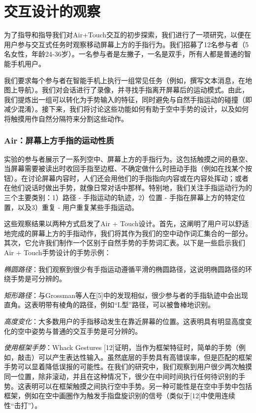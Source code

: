 \section{交互设计的观察}

为了指导和指导我们对Air+Touch交互的初步探索，我们进行了一项研究，以便在用户参与交互式任务时观察移动屏幕上方的手指行为。我们招募了12名参与者（5名女性，年龄24-36岁）。一名参与者是左撇子，一名是双手，所有人都是普通的智能手机用户。

我们要求每个参与者在智能手机上执行一组常见任务（例如，撰写文本消息，在地图上导航）。我们对会话进行了录像，并寻找手指离开屏幕后的运动模式。由此，我们提炼出一组可以转化为手势输入的特征，同时避免与自然手指运动的碰撞（即减少混淆）。接下来，我们将讨论这些功能如何有助于空中手势的设计，以及如何将触摸用作自然分隔符来分割这些动作。 

\subsubsection{Air：屏幕上方手指的运动性质}

实验的参与者展示了一系列空中、屏幕上方的手指行为。这包括触摸之间的悬空、当屏幕需要被读出时收回手指至边框、不确定做什么时扭动手指（例如在找某个按钮）。在讨论屏幕内容时，人们还会用他们的手指指向内容或在内容处挥动；或者在他们说话时做出手势，就像日常对话中那样。特别地，我们关注手指运动行为的三个主要类别：1）路径 - 手指运动的轨迹，2）位置 - 手指在屏幕上方的特定位置，以及3）重复 - 用户重复某些手指运动。

这些观察结果以两种方式启发了Air + Touch设计。首先，这阐明了用户可以舒适地完成的屏幕上方的手指动作，我们将其作为我们的空中动作词汇集合的一部分。其次，它允许我们制作一个区别于自然手势的手势词汇表。以下是一些启示我们Air + Touch手势设计的手势示例：

\textit{椭圆路径}：我们观察到很少有手指运动遵循平滑的椭圆路径，这说明椭圆路径的环绕手势是可分辨的。

\textit{矩形路径}：与Grossman等人在[5]中的发现相似，很少参与者的手指轨迹中会出现直角。这表明带有棱角的路径，例如“L型”路径，可以被鲁棒地识别。


\textit{高度变化}：大多数用户的手指移动发生在靠近屏幕的位置。这表明具有明显高度变化的空中姿势与普通的交互手势是可分辨的。

\textit{使用框架手势}：Whack Gestures [12]证明，当作为框架特征时，简单的手势（例如，敲击）可以产生表达性输入。虽然底层的手势具有高错误率，但是匹配的框架手势可以显着降低误报的可能性。在我们的研究中，我们观察到用户很少两次触摸同一位置，除非滚动，并且在这种情况下，很少在中间时间执行任何待识别的手势。这表明可以在框架触摸之间执行空中手势。另一种可能性是在空中手势中包括框架，例如在空中画圈作为触发手指盘旋识别的信号（类似于[12]中使用连续性“击打”）。


